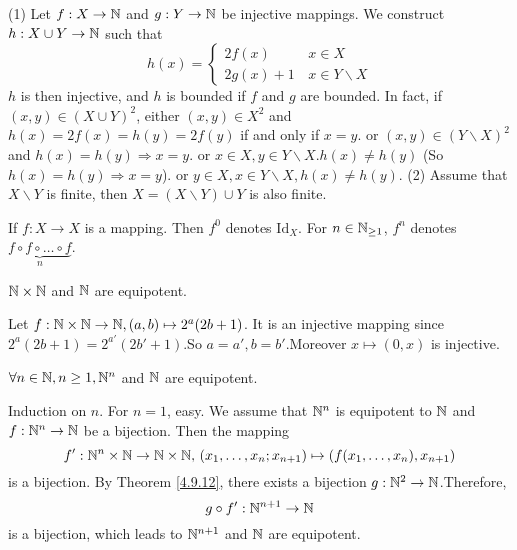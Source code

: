 \documentclass{book}
\numberwithin{equation}{section}
\begin{document}
\begin{proofenv}
    \quad
    \newline
    (1) Let $f:X\rightarrow \NN$ and $g:Y\rightarrow \NN$ be injective mappings. We construct $h:X\cup Y\rightarrow \NN$ such that 
    $$h(x)=\left\{\begin{matrix}
     2f(x)\,  &x\in X\\
    2g(x)+1\, &x\in Y\backslash X

    \end{matrix}\right.$$
    $h$ is then injective,  and $h$ is bounded if $f$ and $g$ are bounded.
    \newline
    In fact,  if $(x, y)\in (X\cup Y)^2$, 
    \newline
    either $(x, y)\in X^2$ and $h(x)=2f(x)=h(y)=2f(y)$ if and only if $x=y$.
    \newline
    or $(x, y)\in (Y\backslash X)^2$ and $h(x)=h(y)\Rightarrow x=y$.
    \newline
    or $x\in X, y\in Y\backslash X.h(x)\not=h(y)$ (So $h(x)=h(y)\Rightarrow x=y$).
    \newline
    or $y\in X, x\in Y\backslash X , h(x)\not=h(y)$.
    \newline
    (2)  Assume that $X\backslash Y$ is finite,  then $X=(X\backslash Y)\cup Y$ is also finite.
\end{proofenv}
\begin{notationenv}
    If $f:X\rightarrow X$  is a mapping. Then $f^0$ denotes $\mathrm{Id}_X$. For $n\in\NN_{\ge 1}$, $f^n$ denotes $\underset{n}{\underbrace{f\circ f\circ \dots \circ f}}$. 
\end{notationenv}
\begin{theoremenv}\label{4.9.12}
    $\NN\times\NN$ and $\NN$ are equipotent.
\end{theoremenv}
\begin{proofenv}
    Let $f:\NN\times\NN\rightarrow \NN, (a, b)\mapsto2^a(2b+1)$. It is an injective mapping since $2^a(2b+1)=2^{a'}(2b'+1)$.So $a=a', b=b'$.Moreover $x\mapsto(0, x)$ is injective.
\end{proofenv}
\begin{corollaryenv}
    $\forall n\in \NN,  n\ge 1, \NN^n$ and $\NN$ are equipotent.
\end{corollaryenv}
\begin{proofenv}
    Induction on $n$.
    \newline
    For $n=1$,  easy. We assume that $\NN^n$ is equipotent to $\NN$ and $f:\NN^n\rightarrow\NN$ be a bijection. Then the mapping
    $$f':\NN^n\times \NN\rightarrow \NN\times\NN, \, \left(x_1, \dots, x_n;x_{n+1}\right)\mapsto\left(f(x_1, \dots, x_n), x_{n+1}\right)$$ 
    is a bijection. By Theorem \ref{4.9.12},  there exists a bijection $g:\NN^2\rightarrow\NN$.Therefore, 
    $$g\circ f':\NN^{n+1}\rightarrow\NN$$
    is a bijection,  which leads to $\NN^{n+1}$ and $\NN$ are equipotent.
\end{proofenv}
\end{document}
